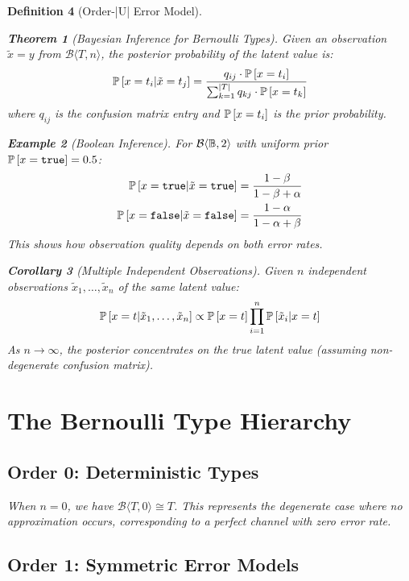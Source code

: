 \documentclass[11pt,final,hidelinks]{article}
\newtheorem{theorem}{Theorem}[section]
\newtheorem{corollary}[theorem]{Corollary}
\newtheorem{definition}[theorem]{Definition}
\newtheorem{example}[theorem]{Example}
\newcommand{\bernoulli}[2]{\mathcal{B}\langle #1, #2 \rangle}
\begin{document}
\begin{definition}[Order-|U| Error Model]
\begin{theorem}[Bayesian Inference for Bernoulli Types]
Given an observation $\tilde{x} = y$ from $\bernoulli{T}{n}$, the posterior probability of the latent value is:
\begin{equation}
\mathbb{P}\left[x = t_i | \tilde{x} = t_j\right] = \frac{q_{ij} \cdot \mathbb{P}\left[x = t_i\right]}{\sum_{k=1}^{|T|} q_{kj} \cdot \mathbb{P}\left[x = t_k\right]}
\end{equation}
where $q_{ij}$ is the confusion matrix entry and $\mathbb{P}\left[x = t_i\right]$ is the prior probability.
\end{theorem}

\begin{example}[Boolean Inference]
For $\bernoulli{\Bool}{2}$ with uniform prior $\mathbb{P}\left[x = \mathtt{true}\right] = 0.5$:
\begin{align}
\mathbb{P}\left[x = \mathtt{true} | \tilde{x} = \mathtt{true}\right] &= \frac{1-\beta}{1-\beta + \alpha} \\
\mathbb{P}\left[x = \mathtt{false} | \tilde{x} = \mathtt{false}\right] &= \frac{1-\alpha}{1-\alpha + \beta}
\end{align}
This shows how observation quality depends on both error rates.
\end{example}

\begin{corollary}[Multiple Independent Observations]
Given $n$ independent observations $\tilde{x}_1, \ldots, \tilde{x}_n$ of the same latent value:
\begin{equation}
\mathbb{P}\left[x = t | \tilde{x}_1, \ldots, \tilde{x}_n\right] \propto \mathbb{P}\left[x = t\right] \prod_{i=1}^n \mathbb{P}\left[\tilde{x}_i | x = t\right]
\end{equation}
As $n \to \infty$, the posterior concentrates on the true latent value (assuming non-degenerate confusion matrix).
\end{corollary}

\section{The Bernoulli Type Hierarchy}

\subsection{Order 0: Deterministic Types}

When $n = 0$, we have $\bernoulli{T}{0} \cong T$. This represents the degenerate case where no approximation occurs, corresponding to a perfect channel with zero error rate.

\subsection{Order 1: Symmetric Error Models}


\end{definition}
\end{document}
